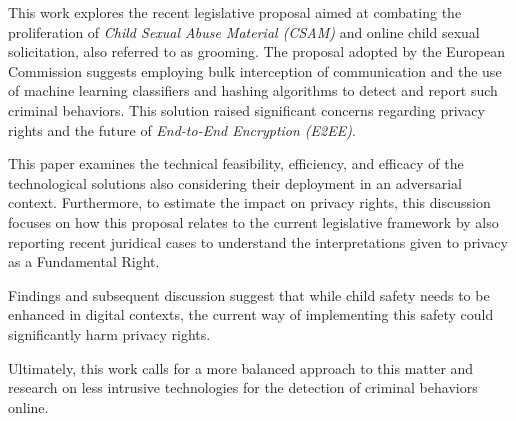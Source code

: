 This work explores the recent legislative proposal aimed at combating the proliferation of \textit{Child Sexual Abuse Material (CSAM)} and online child sexual solicitation, also referred to as grooming. The proposal adopted by the European Commission suggests employing bulk interception of communication and the use of machine learning classifiers and hashing algorithms to detect and report such criminal behaviors. This solution raised significant concerns regarding privacy rights and the future of \textit{End-to-End Encryption (E2EE)}. 

This paper examines the technical feasibility, efficiency, and efficacy of the technological solutions also considering their deployment in an adversarial context. Furthermore, to estimate the impact on privacy rights, this discussion focuses on how this proposal relates to the current legislative framework by also reporting recent juridical cases to understand the interpretations given to privacy as a Fundamental Right.

Findings and subsequent discussion suggest that while child safety needs to be enhanced in digital contexts, the current way of implementing this safety could significantly harm privacy rights. 

Ultimately, this work calls for a more balanced approach to this matter and research on less intrusive technologies for the detection of criminal behaviors online.